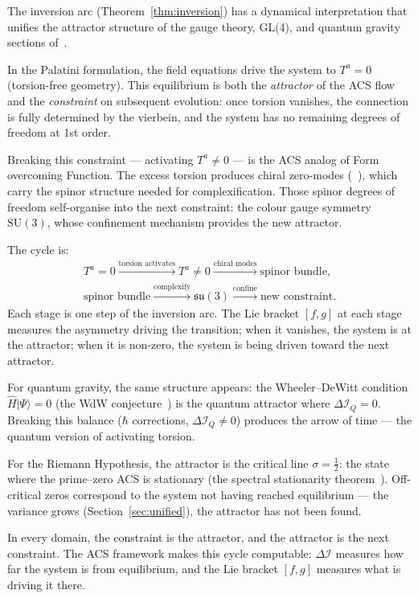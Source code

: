 \documentclass[11pt,a4paper]{article}
\theoremstyle{plain}
\theoremstyle{definition}
\theoremstyle{remark}
\newcommand{\DI}{\Delta\mathcal{I}}
\begin{document}
The inversion arc (Theorem~\ref{thm:inversion}) has a dynamical interpretation
that unifies the attractor structure of the gauge theory, GL(4), and
quantum gravity sections of~\cite{Wallace2026a}.

In the Palatini formulation, the field equations drive the system
to $T^a = 0$ (torsion-free geometry).  This equilibrium is both
the \emph{attractor} of the ACS flow and the \emph{constraint}
on subsequent evolution: once torsion vanishes, the connection is
fully determined by the vierbein, and the system has no remaining
degrees of freedom at 1st order.

Breaking this constraint --- activating $T^a \neq 0$ --- is the
ACS analog of Form overcoming Function.  The excess torsion produces
chiral zero-modes (~\cite{Wallace2026a}), which carry the spinor
structure needed for complexification.  Those spinor degrees of
freedom self-organise into the next constraint: the colour gauge
symmetry $\mathrm{SU}(3)$, whose confinement mechanism provides
the new attractor.

The cycle is:
\[
\begin{gathered}
  T^a=0 \xrightarrow{\text{torsion activates}} T^a\ne0
  \xrightarrow{\text{chiral modes}} \text{spinor bundle},\\
  \text{spinor bundle}\xrightarrow{\text{complexify}}\mathfrak{su}(3)
  \xrightarrow{\text{confine}}\text{new constraint}.
\end{gathered}
\]
Each stage is one step of the inversion arc.
The Lie bracket $[f,g]$ at each stage measures the asymmetry
driving the transition; when it vanishes, the system is at the
attractor; when it is non-zero, the system is being driven
toward the next attractor.

For quantum gravity, the same structure appears:
the Wheeler--DeWitt condition $\hat{H}|\Psi\rangle = 0$
(the WdW conjecture~\cite{Wallace2026a}) is the quantum attractor where
$\DI_Q = 0$.  Breaking this balance ($\hbar$ corrections,
$\DI_Q \neq 0$) produces the arrow of time --- the quantum
version of activating torsion.

For the Riemann Hypothesis, the attractor is the critical line
$\sigma = \tfrac{1}{2}$: the state where the prime--zero ACS is
stationary (the spectral stationarity theorem~\cite{Wallace2026b}).  Off-critical zeros
correspond to the system not having reached equilibrium --- the
variance grows (Section~\ref{sec:unified}), the attractor has
not been found.

In every domain, the constraint is the attractor, and the attractor
is the next constraint.  The ACS framework makes this cycle
computable: $\DI$ measures how far the system is from equilibrium,
and the Lie bracket $[f,g]$ measures what is driving it there.
\end{document}
